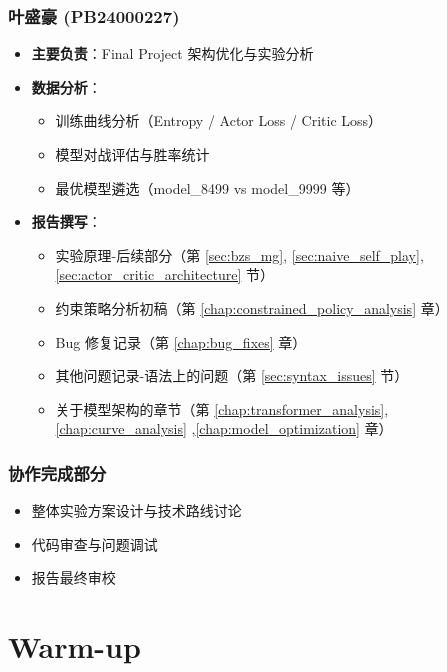 \documentclass[oneside]{ctexbook}
\begin{document}
\subsection{叶盛豪 (PB24000227)}
\begin{itemize}
    \item \textbf{主要负责}：Final Project 架构优化与实验分析
    \item \textbf{数据分析}：
    \begin{itemize}
        \item 训练曲线分析（Entropy / Actor Loss / Critic Loss）
        \item 模型对战评估与胜率统计
        \item 最优模型遴选（model\_8499 vs model\_9999 等）
    \end{itemize}
    \item \textbf{报告撰写}：
    \begin{itemize}
        \item 实验原理-后续部分（第 \ref{sec:bzs_mg}, \ref{sec:naive_self_play}, \ref{sec:actor_critic_architecture} 节）
        \item 约束策略分析初稿（第 \ref{chap:constrained_policy_analysis} 章）
        \item Bug 修复记录（第 \ref{chap:bug_fixes} 章）
        \item 其他问题记录-语法上的问题（第 \ref{sec:syntax_issues} 节）
        \item 关于模型架构的章节（第 \ref{chap:transformer_analysis}, \ref{chap:curve_analysis} ,\ref{chap:model_optimization} 章）
    \end{itemize}
\end{itemize}

\subsection{协作完成部分}
\begin{itemize}
    \item 整体实验方案设计与技术路线讨论
    \item 代码审查与问题调试
    \item 报告最终审校
\end{itemize}

\tableofcontents

\mainmatter  %

\chapter{Warm-up} \label{chap:warmup}
\end{document}
